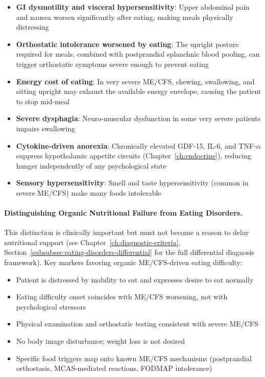 \begin{itemize}
    \item \textbf{GI dysmotility and visceral hypersensitivity}: Upper abdominal pain and nausea worsen significantly after eating, making meals physically distressing~\cite{Gijsbers2023gastric}
    \item \textbf{Orthostatic intolerance worsened by eating}: The upright posture required for meals, combined with postprandial splanchnic blood pooling, can trigger orthostatic symptoms severe enough to prevent eating
    \item \textbf{Energy cost of eating}: In very severe ME/CFS, chewing, swallowing, and sitting upright may exhaust the available energy envelope, causing the patient to stop mid-meal
    \item \textbf{Severe dysphagia}: Neuro-muscular dysfunction in some very severe patients impairs swallowing
    \item \textbf{Cytokine-driven anorexia}: Chronically elevated GDF-15, IL-6, and TNF-$\alpha$ suppress hypothalamic appetite circuits (Chapter~\ref{ch:endocrine}), reducing hunger independently of any psychological state
    \item \textbf{Sensory hypersensitivity}: Smell and taste hypersensitivity (common in severe ME/CFS) make many foods intolerable
\end{itemize}

\paragraph{Distinguishing Organic Nutritional Failure from Eating Disorders.}
This distinction is clinically important but must not become a reason to delay nutritional support (see Chapter~\ref{ch:diagnostic-criteria}, Section~\ref{subsubsec:eating-disorders-differential} for the full differential diagnosis framework). Key markers favoring organic ME/CFS-driven eating difficulty:

\begin{itemize}
    \item Patient is distressed by inability to eat and expresses desire to eat normally
    \item Eating difficulty onset coincides with ME/CFS worsening, not with psychological stressors
    \item Physical examination and orthostatic testing consistent with severe ME/CFS
    \item No body image disturbance; weight loss is not desired
    \item Specific food triggers map onto known ME/CFS mechanisms (postprandial orthostasis, MCAS-mediated reactions, FODMAP intolerance)
\end{itemize}

